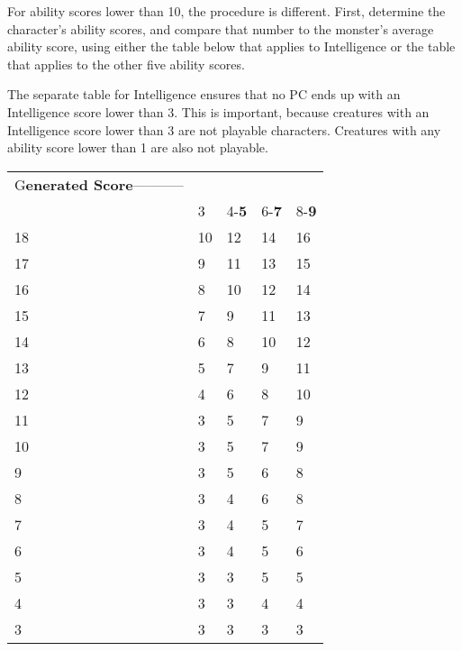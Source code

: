 \documentclass{article}
\begin{document}
\vspace{12pt}
For ability scores lower than 10, the procedure is different. First, determine 
the character's ability scores, and compare that number to the monster's average 
ability score, using either the table below that applies to Intelligence or the 
table that applies to the other five ability scores. 

The separate table for Intelligence ensures that no PC ends up with an Intelligence 
score lower than 3. This is important, because creatures with an Intelligence score 
lower than 3 are not playable characters. Creatures with any ability score lower 
than 1 are also not playable.

\vspace{12pt}
\begin{tabular}{|>{\raggedright}p{43pt}|>{\raggedright}p{42pt}|>{\raggedright}p{42pt}|>{\raggedright}p{42pt}|>{\raggedright}p{42pt}|}
\hline
\multicolumn{5}{|p{212pt}|}{M\textbf{onster PCs' Intelligence Scores}}\tabularnewline
\hline
G\textbf{enerated Score}----------- & \multicolumn{4}{p{168pt}|}{ \textbf{Monster 
Intelligence Score ------------}}\tabularnewline
\hline
 & 3 & 4-\textbf{5} & 6-\textbf{7} & 8-\textbf{9}\tabularnewline
\hline
18 & 10 & 12 & 14 & 16\tabularnewline
\hline
17 & 9 & 11 & 13 & 15\tabularnewline
\hline
16 & 8 & 10 & 12 & 14\tabularnewline
\hline
15 & 7 & 9 & 11 & 13\tabularnewline
\hline
14 & 6 & 8 & 10 & 12\tabularnewline
\hline
13 & 5 & 7 & 9 & 11\tabularnewline
\hline
12 & 4 & 6 & 8 & 10\tabularnewline
\hline
11 & 3 & 5 & 7 & 9\tabularnewline
\hline
10 & 3 & 5 & 7 & 9\tabularnewline
\hline
9 & 3 & 5 & 6 & 8\tabularnewline
\hline
8 & 3 & 4 & 6 & 8\tabularnewline
\hline
7 & 3 & 4 & 5 & 7\tabularnewline
\hline
6 & 3 & 4 & 5 & 6\tabularnewline
\hline
5 & 3 & 3 & 5 & 5\tabularnewline
\hline
4 & 3 & 3 & 4 & 4\tabularnewline
\hline
3 & 3 & 3 & 3 & 3\tabularnewline
\hline
\end{tabular}
\end{document}
